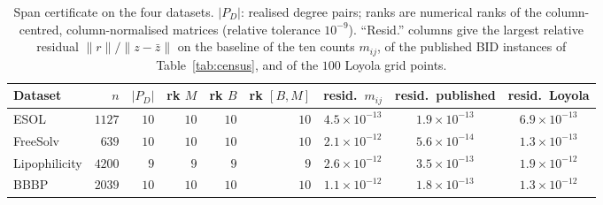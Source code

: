 \begin{table}[h]
\centering
\small
\caption{Span certificate on the four datasets. $|P_D|$: realised degree pairs; ranks are numerical ranks of the column-centred, column-normalised matrices (relative tolerance $10^{-9}$). ``Resid.'' columns give the largest relative residual $\|r\|/\|z-\bar z\|$ on the baseline of the ten counts $m_{ij}$, of the \nCensusInst{} published BID instances of Table~\ref{tab:census}, and of the $100$ Loyola grid points.}
\label{tab:cert}
\setlength{\tabcolsep}{4pt}
\begin{tabular}{lrrrrrccc}
\toprule
Dataset & $n$ & $|P_D|$ & rk $M$ & rk $B$ & rk $[B,M]$ & resid.\ $m_{ij}$ & resid.\ published & resid.\ Loyola\\
\midrule
ESOL & $1127$ & $10$ & $10$ & $10$ & $10$ & $4.5\times10^{-13}$ & $1.9\times10^{-13}$ & $6.9\times10^{-13}$\\
FreeSolv & $639$ & $10$ & $10$ & $10$ & $10$ & $2.1\times10^{-12}$ & $5.6\times10^{-14}$ & $1.3\times10^{-13}$\\
Lipophilicity & $4200$ & $9$ & $9$ & $9$ & $9$ & $2.6\times10^{-12}$ & $3.5\times10^{-13}$ & $1.9\times10^{-12}$\\
BBBP & $2039$ & $10$ & $10$ & $10$ & $10$ & $1.1\times10^{-12}$ & $1.8\times10^{-13}$ & $1.3\times10^{-12}$\\
\bottomrule
\end{tabular}
\end{table}
